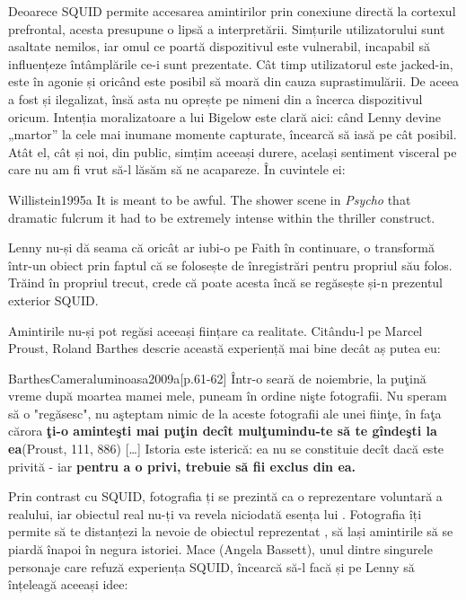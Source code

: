 \documentclass[12pt]{article}
\begin{document}
	Deoarece SQUID permite accesarea amintirilor prin conexiune directă la cortexul prefrontal, acesta presupune o lipsă a interpretării. Simțurile utilizatorului sunt asaltate nemilos, iar omul ce poartă dispozitivul este vulnerabil, incapabil să influențeze întâmplările ce-i sunt prezentate. Cât timp utilizatorul este jacked-in, este în agonie și oricând este posibil să moară din cauza suprastimulării. De aceea a fost și ilegalizat, însă asta nu oprește pe nimeni din a încerca dispozitivul oricum. Intenția moralizatoare a lui Bigelow este clară aici: când Lenny devine „martor” la cele mai inumane momente capturate, încearcă să iasă pe cât posibil. Atât el, cât și noi, din public, simțim aceeași durere, același sentiment visceral pe care nu am fi vrut să-l lăsăm să ne acapareze. În cuvintele ei:\par
	
	\begin{displaycquote}{Willistein1995a}
		It is meant to be awful. The shower scene in \textit{Psycho} \textemdash that dramatic fulcrum \textemdash it had to be extremely intense within the thriller construct.
	\end{displaycquote}
	
	Lenny nu-și dă seama că oricât ar iubi-o pe Faith în continuare, o transformă într-un obiect prin faptul că se folosește de înregistrări pentru propriul său folos. Trăind în propriul trecut, crede că poate acesta încă se regăsește și-n prezentul exterior SQUID.\par
	
	Amintirile nu-și pot regăsi aceeași ființare ca realitate. Citându-l pe Marcel Proust, Roland Barthes descrie această experiență mai bine decât aș putea eu:
	
	\begin{displaycquote}{BarthesCameraluminoasa2009a}[p.61-62]
			Într-o seară de noiembrie, la puţină vreme după moartea mamei mele, puneam în ordine nişte fotografii. Nu speram să o "regăsesc", nu aşteptam nimic de la \guillemetleft aceste fotografii ale unei fiinţe, în faţa cărora \textbf{ţi-o aminteşti mai puţin decît mulţumindu-te să te gîndeşti la ea}\guillemetright  (Proust, 111, 886) […] Istoria este isteri­că: ea nu se constituie decît dacă este privită - iar \textbf{pentru a o privi, trebuie să fii exclus din ea.}
	\end{displaycquote}
	
	Prin contrast cu SQUID, fotografia ți se prezintă ca o reprezentare voluntară a realului, iar obiectul real nu-ți va revela niciodată esența lui \parencite{BarthesCameraluminoasa2009a}. Fotografia îți permite să te distanțezi la nevoie de obiectul reprezentat \parencite{secSontagPlatosCavea}, să lași amintirile să se piardă înapoi în negura istoriei. Mace (Angela Bassett), unul dintre singurele personaje care refuză experiența SQUID, încearcă să-l facă și pe Lenny să înțeleagă aceeași idee:
	
\end{document}
